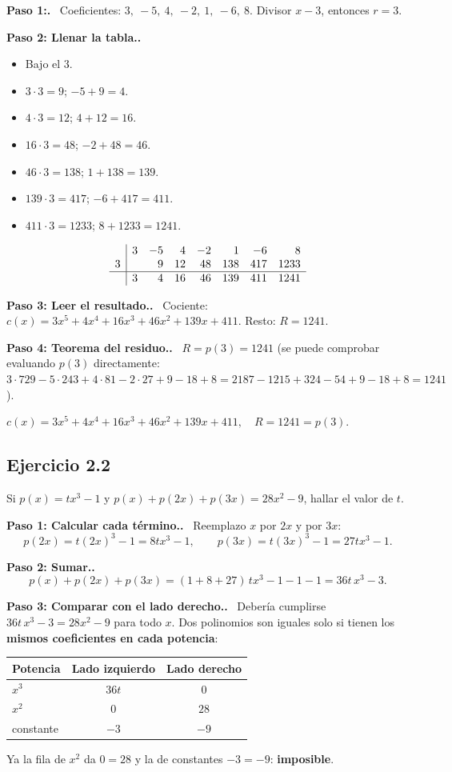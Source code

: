\documentclass[11pt,a4paper]{article}
\newcommand{\paso}[1]{\par\medskip\noindent\textbf{\textcolor{blue!50!black}{Paso #1.}}\ }
\begin{document}
\paso{1:} Coeficientes: $3,\ -5,\ 4,\ -2,\ 1,\ -6,\ 8$. Divisor $x-3$, entonces $r=3$.

\paso{2: Llenar la tabla.}
\begin{itemize}[nosep]
  \item Bajo el $3$.
  \item $3\cdot3=9$; $-5+9=4$.
  \item $4\cdot3=12$; $4+12=16$.
  \item $16\cdot3=48$; $-2+48=46$.
  \item $46\cdot3=138$; $1+138=139$.
  \item $139\cdot3=417$; $-6+417=411$.
  \item $411\cdot3=1233$; $8+1233=1241$.
\end{itemize}
\[
\begin{array}{r|rrrrrrr}
 & 3 & -5 & 4 & -2 & 1 & -6 & 8\\
3 & & 9 & 12 & 48 & 138 & 417 & 1233\\ \hline
 & 3 & 4 & 16 & 46 & 139 & 411 & 1241
\end{array}
\]
\paso{3: Leer el resultado.} Cociente: $c(x)=3x^5+4x^4+16x^3+46x^2+139x+411$. Resto: $R=1241$.

\paso{4: Teorema del residuo.} $R=p(3)=1241$ (se puede comprobar evaluando $p(3)$ directamente: $3\cdot729-5\cdot243+4\cdot81-2\cdot27+9-18+8=2187-1215+324-54+9-18+8=1241$ \checkmark).
\begin{respuesta}
$c(x)=3x^5+4x^4+16x^3+46x^2+139x+411,\quad R=1241=p(3).$
\end{respuesta}

\subsection{Ejercicio 2.2}
\begin{enunciado}
Si $p(x)=tx^3-1$ y $p(x)+p(2x)+p(3x)=28x^2-9$, hallar el valor de $t$.
\end{enunciado}

\paso{1: Calcular cada término.} Reemplazo $x$ por $2x$ y por $3x$:
\[ p(2x)=t(2x)^3-1=8tx^3-1,\qquad p(3x)=t(3x)^3-1=27tx^3-1. \]

\paso{2: Sumar.}
\[ p(x)+p(2x)+p(3x)=(1+8+27)\,tx^3-1-1-1=36t\,x^3-3. \]

\paso{3: Comparar con el lado derecho.} Debería cumplirse $36t\,x^3-3=28x^2-9$ para todo $x$. Dos polinomios son iguales solo si tienen los \textbf{mismos coeficientes en cada potencia}:
\begin{center}
\begin{tabular}{lcc}
\toprule
Potencia & Lado izquierdo & Lado derecho\\ \midrule
$x^3$ & $36t$ & $0$\\
$x^2$ & $0$ & $28$\\
constante & $-3$ & $-9$\\ \bottomrule
\end{tabular}
\end{center}
Ya la fila de $x^2$ da $0=28$ y la de constantes $-3=-9$: \textbf{imposible}.
\end{document}
